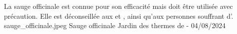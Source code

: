 {%
    La sauge officinale est connue pour son efficacité mais doit être utilisée avec précaution. Elle est déconseillée aux  et , ainsi qu'aux personnes souffrant d'. 
}
{%
    sauge_officinale.jpeg
}
{%
    Sauge officinale
}
{%
    Jardin des thermes de  - 04/08/2024 
}
